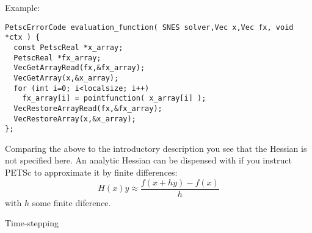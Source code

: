 Example:
\begin{lstlisting}
PetscErrorCode evaluation_function( SNES solver,Vec x,Vec fx, void *ctx ) {
  const PetscReal *x_array;
  PetscReal *fx_array;
  VecGetArrayRead(fx,&fx_array);
  VecGetArray(x,&x_array);
  for (int i=0; i<localsize; i++)
    fx_array[i] = pointfunction( x_array[i] );
  VecRestoreArrayRead(fx,&fx_array);
  VecRestoreArray(x,&x_array);
};
\end{lstlisting}

Comparing the above to the introductory description you see that
the Hessian is not specified here.
An analytic Hessian can be dispensed with if you instruct
PETSc to approximate it by finite differences:
\[ H(x)y \approx \frac{f(x+hy)-f(x)}{h} \]
with $h$ some finite diference.

 {Time-stepping}
